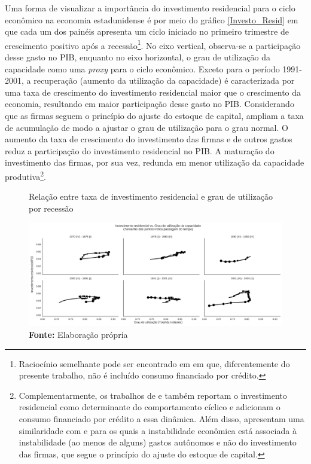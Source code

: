 Uma forma de visualizar a importância do investimento residencial para o ciclo econômico na economia estadunidense é por meio do gráfico \ref{Investo_Resid} em que cada um dos painéis apresenta um ciclo iniciado no primeiro trimestre de crescimento positivo após a recessão\footnote{
	Raciocínio semelhante pode ser encontrado em \textcite{fiebiger_semi-autonomous_2018} em que, diferentemente do presente trabalho, não é incluído consumo financiado por crédito.}. 
No eixo vertical, observa-se a participação desse gasto no PIB, enquanto no eixo horizontal, o grau de utilização da capacidade como uma \textit{proxy} para o ciclo econômico. Exceto para o período 1991-2001, a recuperação (aumento da utilização da capacidade) é caracterizada por uma taxa de crescimento do investimento residencial maior que o crescimento da economia, resultando em maior participação desse gasto no PIB. Considerando que as firmas seguem o princípio do ajuste do estoque de capital, ampliam a taxa de acumulação de modo a ajustar o grau de utilização para o grau normal. O aumento da taxa de crescimento do investimento das firmas e de outros gastos reduz a participação do investimento residencial no PIB. A maturação do investimento das firmas, por sua vez, redunda em menor utilização da capacidade produtiva\footnote{
	Complementarmente, os trabalhos de \textcite{fiebiger_semi-autonomous_2018} e \textcite{fiebiger_trend_2017} também reportam o investimento residencial como determinante do comportamento cíclico e adicionam o consumo financiado por crédito a essa dinâmica. Além disso, apresentam uma similaridade com \textcite{dejuan_hidden_2017} e \textcite{teixeira_crescimento_2015} para os quais a instabilidade econômica está associada à instabilidade (ao menos de alguns) gastos autônomos e não do investimento das firmas, que segue o princípio do ajuste do estoque de capital.}. 



\begin{figure}[H]
	\centering
	\caption{Relação entre taxa de investimento residencial e grau de utilização por recessão}
	\label{FigIh_u}
	\includegraphics[width=\textwidth]{../../Dados/Fatos_Estilizados/figs/Ciclo_Ih_u.png}
	\caption*{\textbf{Fonte:} Elaboração própria}
\end{figure}

